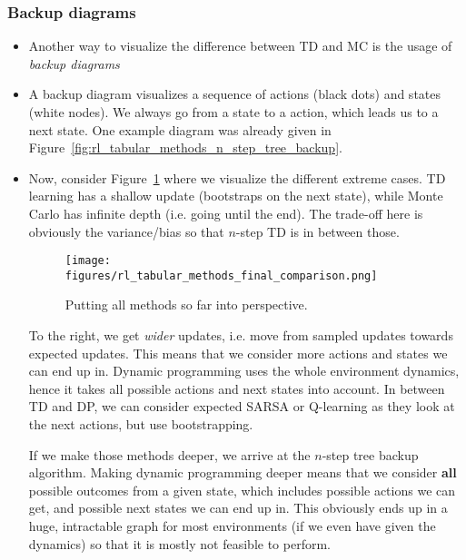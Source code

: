 \subsubsection{Backup diagrams}
\label{sec:value_based_tabular_backup_diagram}
\begin{itemize}
	\item Another way to visualize the difference between TD and MC is the usage of \textit{backup diagrams}
	\item A backup diagram visualizes a sequence of actions (black dots) and states (white nodes). We always go from a state to a action, which leads us to a next state. One example diagram was already given in Figure~\ref{fig:rl_tabular_methods_n_step_tree_backup}.
	\item Now, consider Figure~\ref{fig:rl_tabular_methods_final_comparison} where we visualize the different extreme cases. TD learning has a shallow update (bootstraps on the next state), while Monte Carlo has infinite depth (i.e. going until the end). The trade-off here is obviously the variance/bias so that $n$-step TD is in between those.
	
	\begin{figure}[ht!]
		\centering
		\texttt{[image: figures/rl\_tabular\_methods\_final\_comparison.png]}
		\caption{Putting all methods so far into perspective.}
		\label{fig:rl_tabular_methods_final_comparison}
	\end{figure}
	
	To the right, we get \textit{wider} updates, i.e. move from sampled updates towards expected updates. This means that we consider more actions and states we can end up in. Dynamic programming uses the whole environment dynamics, hence it takes all possible actions and next states into account. In between TD and DP, we can consider expected SARSA or Q-learning as they look at the next actions, but use bootstrapping. 
	
	If we make those methods deeper, we arrive at the $n$-step tree backup algorithm. Making dynamic programming deeper means that we consider \textbf{all} possible outcomes from a given state, which includes possible actions we can get, and possible next states we can end up in. This obviously ends up in a huge, intractable graph for most environments (if we even have given the dynamics) so that it is mostly not feasible to perform.
\end{itemize}
